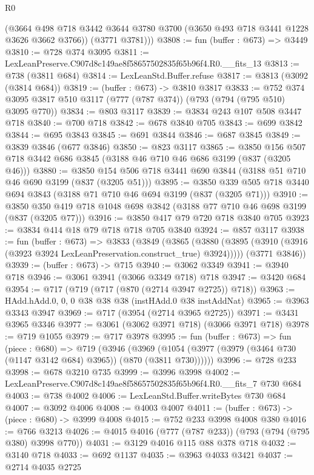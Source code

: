 \begin{lexlean}{R0}
\begin{coremodule}
        (@3664 @498 @718 @3442 @3644 @3780 @3700 (@3650 @493 @718 @3441 @1228 @3626 @3662 @3766))
        (@3771 @3781)))
@3808 := fun (buffer : @673) => @3449
@3810 := @728 @374 @3095
@3811 := LexLeanPreserve.C907d8c149ae8f58657502835f65b96f4.R0.__fits_13
@3813 := @738 (@3811 @684)
@3814 := LexLeanStd.Buffer.refuse
@3817 := @3813 (@3092 (@3814 @684))
@3819 := (buffer : @673) -> @3810 @3817
@3833 := @752 @374 @3095 @3817 @510 @3117 (@777 (@787 @374)) (@793 (@794 (@795 @510) @3095 @770))
@3834 := @803 @3117
@3839 := @3834 @243 @107 @508 @3447 @718
@3840 := @700 @718
@3842 := @678 @3840 @705
@3843 := @699 @3842
@3844 := @695 @3843
@3845 := @691 @3844
@3846 := @687 @3845
@3849 := @3839 @3846 (@677 @3846)
@3850 := @823 @3117
@3865 := @3850 @156 @507 @718 @3442 @686 @3845 (@3188 @46 @710 @46 @686 @3199 (@837 (@3205 @46)))
@3880 := @3850 @154 @506 @718 @3441 @690 @3844 (@3188 @51 @710 @46 @690 @3199 (@837 (@3205 @51)))
@3895 := @3850 @339 @505 @718 @3440 @694 @3843 (@3188 @71 @710 @46 @694 @3199 (@837 (@3205 @71)))
@3910 := @3850 @350 @419 @718 @1048 @698 @3842 (@3188 @77 @710 @46 @698 @3199 (@837 (@3205 @77)))
@3916 := @3850 @417 @79 @720 @718 @3840 @705
@3923 := @3834 @414 @18 @79 @718 @718 @705 @3840
@3924 := @857 @3117
@3938 := fun (buffer : @673) =>
  @3833
    (@3849
      (@3865 (@3880 (@3895 (@3910 (@3916 (@3923 @3924 LexLeanPreservation.construct_true) @3924)))))
      (@3771 @3846))
@3939 := (buffer : @673) -> @715
@3940 := @3062 @3349
@3941 := @3940 @718
@3946 := @3061 @3941 (@3066 @3349 @718) @718
@3947 := @3420 @684
@3954 := @717 (@719 (@717 (@870 (@2714 @3947 @2725)) @718))
@3963 := HAdd.hAdd.{0, 0, 0} @38 @38 @38 (instHAdd.{0} @38 instAddNat)
@3965 := @3963 @3343 @3947
@3969 := @717 (@3954 (@2714 @3965 @2725))
@3971 := @3431 @3965 @3346
@3977 := @3061 (@3062 @3971 @718) (@3066 @3971 @718)
@3978 := @719 @1055
@3979 := @717 @3978
@3995 := fun (buffer : @673) =>
  fun (piece : @680) =>
  @719
    (@3946
      (@3969 (@1054 (@3977 (@3979 (@3464 @730 (@1147 @3142 @684) @3965)) (@870 (@3811 @730))))))
@3996 := @728 @233
@3998 := @678 @3210 @735
@3999 := @3996 @3998
@4002 := LexLeanPreserve.C907d8c149ae8f58657502835f65b96f4.R0.__fits_7 @730 @684
@4003 := @738 @4002
@4006 := LexLeanStd.Buffer.writeBytes @730 @684
@4007 := @3092 @4006
@4008 := @4003 @4007
@4011 := (buffer : @673) -> (piece : @680) -> @3999 @4008
@4015 := @752 @233 @3998 @4008 @380
@4016 := @766 @3213
@4026 := @4015 @4016 (@777 (@787 @233)) (@793 (@794 (@795 @380) @3998 @770))
@4031 := @3129 @4016 @115 @88 @378 @718
@4032 := @3140 @718
@4033 := @692 @1137
@4035 := @3963 @4033 @3421
@4037 := @2714 @4035 @2725

\end{coremodule}
\end{lexlean}
